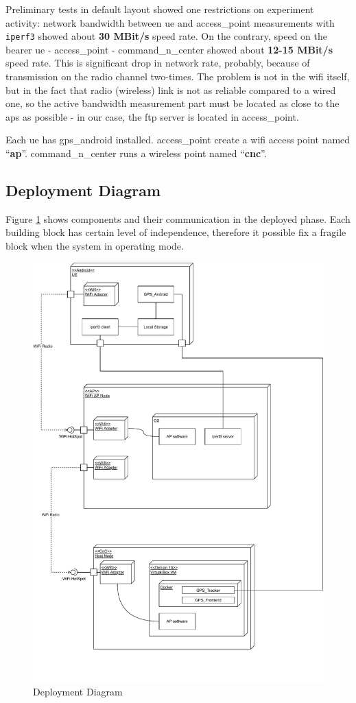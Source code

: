 Preliminary tests in default layout showed one restrictions on experiment activity: network bandwidth
between \gls{ue} and \acrshort{access_point} measurements with \texttt{iperf3} showed about \textbf{30 MBit/s} speed rate. On the contrary, speed on the bearer \gls{ue} - \acrshort{access_point} - \gls{command_n_center} showed about \textbf{12-15 MBit/s} speed rate. This is significant drop in network rate, probably, because of transmission on the radio channel two-times. The problem  is not in the \gls{wifi} itself, but in the fact that radio (wireless) link is not as reliable compared to a wired one, so the active bandwidth measurement part must be located as close to the \glspl{ap} as possible - in our case, the \acrshort{ftp} server is located in \acrshort{access_point}.

Each \gls{ue} has   \gls{gps_android} installed. \Gls{access_point} create a \gls{wifi} access point named ``\textbf{ap}''.
\Gls{command_n_center} runs a wireless point named
``\textbf{cnc}''.

\subsection{Deployment Diagram}\label{deployment-diagram}

Figure \ref{fig:deployment-diagram} shows components and their communication in the deployed phase. Each building block has certain level of independence, therefore it possible fix a fragile block when the system in operating mode.

\begin{figure}[H]
	\centering
	\includegraphics[width=0.8\linewidth, keepaspectratio]{images/Deployment Diagram-Deployment_Diagram.pdf}
	\caption{Deployment Diagram}
	\label{fig:deployment-diagram}
\end{figure}

